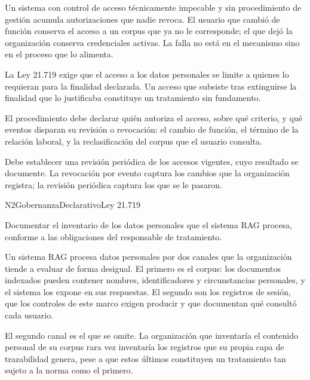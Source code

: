 Un sistema con control de acceso técnicamente impecable y sin procedimiento de gestión acumula autorizaciones que nadie revoca. El usuario que cambió de función conserva el acceso a un corpus que ya no le corresponde; el que dejó la organización conserva credenciales activas. La falla no está en el mecanismo sino en el proceso que lo alimenta.

La Ley 21.719 exige que el acceso a los datos personales se limite a quienes lo requieran para la finalidad declarada. Un acceso que subsiste tras extinguirse la finalidad que lo justificaba constituye un tratamiento sin fundamento.

El procedimiento debe declarar quién autoriza el acceso, sobre qué criterio, y qué eventos disparan su revisión o revocación: el cambio de función, el término de la relación laboral, y la reclasificación del corpus que el usuario consulta.

Debe establecer una revisión periódica de los accesos vigentes, cuyo resultado se documente. La revocación por evento captura los cambios que la organización registra; la revisión periódica captura los que se le pasaron.


  {N2}{Gobernanza}{Declarativo}{Ley 21.719}

Documentar el inventario de los datos personales que el sistema RAG procesa, conforme a las obligaciones del responsable de tratamiento.

Un sistema RAG procesa datos personales por dos canales que la organización tiende a evaluar de forma desigual. El primero es el corpus: los documentos indexados pueden contener nombres, identificadores y circunstancias personales, y el sistema los expone en sus respuestas. El segundo son los registros de sesión, que los controles de este marco exigen producir y que documentan qué consultó cada usuario.

El segundo canal es el que se omite. La organización que inventaría el contenido personal de su corpus rara vez inventaría los registros que su propia capa de trazabilidad genera, pese a que estos últimos constituyen un tratamiento tan sujeto a la norma como el primero.

